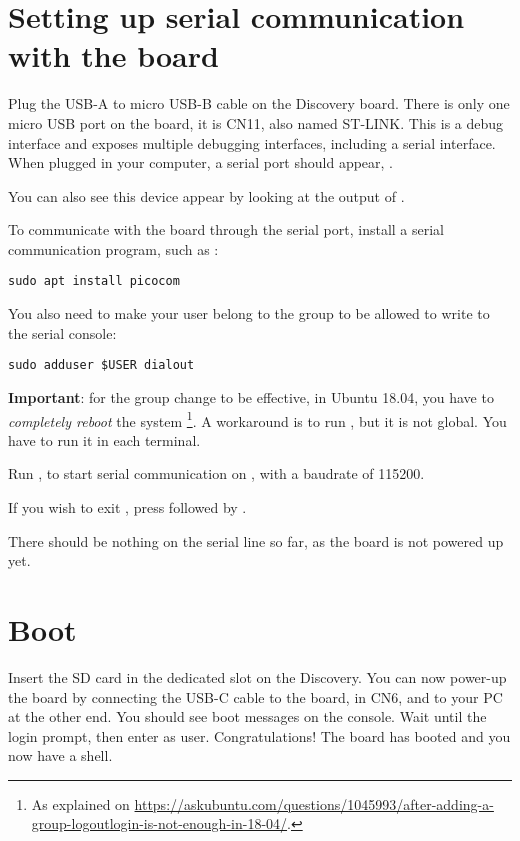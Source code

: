 \section{Setting up serial communication with the board}

Plug the USB-A to micro USB-B cable on the Discovery board. There is
only one micro USB port on the board, it is CN11, also named ST-LINK.
This is a debug interface and exposes multiple debugging interfaces,
including a serial interface. When plugged in your computer, a serial
port should appear, .

You can also see this device appear by looking at the output of
.

To communicate with the board through the serial port, install a
serial communication program, such as :

\begin{verbatim}
sudo apt install picocom
\end{verbatim}

You also need to make your user belong to the  group to be
allowed to write to the serial console:

\begin{verbatim}
sudo adduser $USER dialout
\end{verbatim}

{\bf Important}: for the group change to be effective, in Ubuntu 18.04, you have to
{\em completely reboot} the system \footnote{As explained on
\url{https://askubuntu.com/questions/1045993/after-adding-a-group-logoutlogin-is-not-enough-in-18-04/}.}.
A workaround is to run , but it is not global.
You have to run it in each terminal.

Run , to start serial
communication on , with a baudrate of 115200.

If you wish to exit , press \code{[Ctrl][a]} followed by
\code{[Ctrl][x]}.

There should be nothing on the serial line so far, as the board is not
powered up yet.

\section{Boot}

Insert the SD card in the dedicated slot on the Discovery.  You can
now power-up the board by connecting the USB-C cable to the board, in
CN6,  and to your PC at the other end.  You should see
boot messages on the console. Wait until the login prompt, then enter
 as user.  Congratulations! The board has booted and you
now have a shell.
